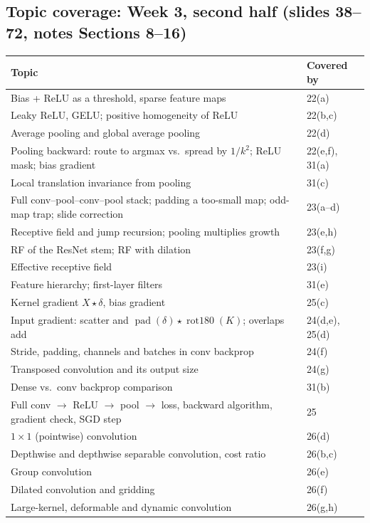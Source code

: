 \documentclass[12pt,a4paper]{article}
\newcommand{\rot}{\operatorname{rot180}}
\begin{document}
\subsection*{Topic coverage: Week 3, second half (slides 38--72, notes Sections 8--16)}
\begin{center}
\begin{tabular}{@{}>{\raggedright\arraybackslash}p{}l@{}}
\toprule
Topic & Covered by\\
\midrule
Bias + ReLU as a threshold, sparse feature maps & 22(a)\\
Leaky ReLU, GELU; positive homogeneity of ReLU & 22(b,c)\\
Average pooling and global average pooling & 22(d)\\
Pooling backward: route to argmax vs.\ spread by $1/k^2$; ReLU mask; bias gradient & 22(e,f), 31(a)\\
Local translation invariance from pooling & 31(c)\\
Full conv--pool--conv--pool stack; padding a too-small map; odd-map trap; slide correction & 23(a--d)\\
Receptive field and jump recursion; pooling multiplies growth & 23(e,h)\\
RF of the ResNet stem; RF with dilation & 23(f,g)\\
Effective receptive field & 23(i)\\
Feature hierarchy; first-layer filters & 31(e)\\
Kernel gradient $X\star\delta$, bias gradient & 25(c)\\
Input gradient: scatter and $\operatorname{pad}(\delta)\star\rot(K)$; overlaps add & 24(d,e), 25(d)\\
Stride, padding, channels and batches in conv backprop & 24(f)\\
Transposed convolution and its output size & 24(g)\\
Dense vs.\ conv backprop comparison & 31(b)\\
Full conv $\to$ ReLU $\to$ pool $\to$ loss, backward algorithm, gradient check, SGD step & 25\\
$1\times1$ (pointwise) convolution & 26(d)\\
Depthwise and depthwise separable convolution, cost ratio & 26(b,c)\\
Group convolution & 26(e)\\
Dilated convolution and gridding & 26(f)\\
Large-kernel, deformable and dynamic convolution & 26(g,h)\\

\end{tabular}
\end{center}
\end{document}
